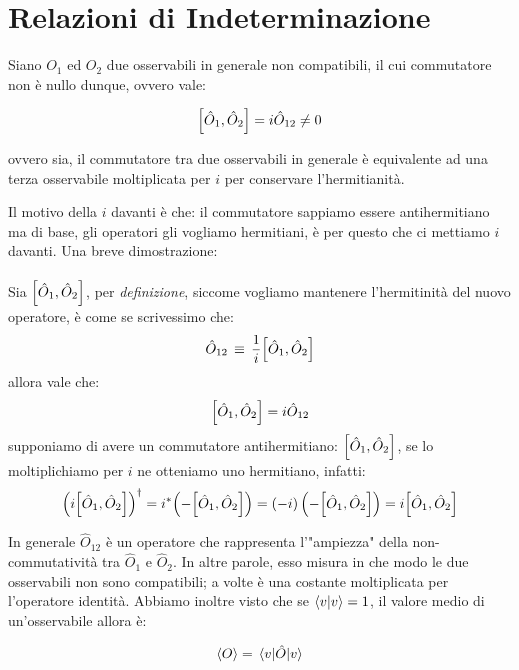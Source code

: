 \section{Relazioni di Indeterminazione}

	Siano $O_1$ ed $O_2$ due osservabili in generale non compatibili, il cui commutatore non è nullo dunque, ovvero vale:
	
\begin{align*}
	\qty[\hat{O}_1, \hat{O}_2] = i \hat{O}_{12} \neq 0
\end{align*}

	ovvero sia, il commutatore tra due osservabili in generale è equivalente ad una terza osservabile moltiplicata per $i$ per conservare l'hermitianità. 
	
\begin{myapprf}
	Il motivo della $i$ davanti è che: il commutatore sappiamo essere antihermitiano ma di base, gli operatori gli vogliamo hermitiani, è per questo che ci mettiamo $i$ davanti. Una breve dimostrazione:
	\\
	\\
	Sia $\qty[\hat{O}_1, \hat{O}_2]$, per \textit{definizione}, siccome vogliamo mantenere l'hermitinità del nuovo operatore, è come se scrivessimo che:
\begin{align*}
	\hat{O}_{12} \, \equiv \, \frac{1}{i}\qty[\hat{O}_1, \hat{O}_2]
\end{align*} 
	allora vale che:
\begin{align*}
	\qty[\hat{O}_1, \hat{O}_2] = i \hat{O}_{12} 
\end{align*} 
	supponiamo di avere un commutatore antihermitiano: $\qty[\hat{O}_1, \hat{O}_2]$, se lo moltiplichiamo per $i$ ne otteniamo uno hermitiano, infatti:
\begin{align*}
	\qty( i \qty[\hat{O}_1, \hat{O}_2] )^{\dagger} = i^* \qty(- \qty[\hat{O}_1, \hat{O}_2] ) = \qty(-i) \, \qty(- \qty[\hat{O}_1, \hat{O}_2] ) = i \qty[\hat{O}_1, \hat{O}_2]
\end{align*}
\end{myapprf}
	
	In generale $\hat{O}_{12}$ è un operatore che rappresenta l'"ampiezza" della non-commutatività tra $\hat{O}_1$ e $\hat{O}_2$. In altre parole, esso misura in che modo le due osservabili non sono compatibili; a volte è una costante moltiplicata per l'operatore identità. Abbiamo inoltre visto che se $\braket{v} = 1$, il valore medio di un'osservabile allora è:
	
\begin{align*}
	\langle O \rangle = \mel{v}{\hat{O}}{v}
\end{align*}


